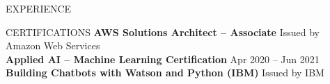\documentclass{resume} %
\begin{document}
\begin{rSection}{EXPERIENCE}
\end{rSection}



\vspace{-0.2em}
\begin{rSection}{CERTIFICATIONS}
\textbf{AWS Solutions Architect – Associate} \hfill Issued by Amazon Web Services \\
\textbf{Applied AI – Machine Learning Certification} \hfill Apr 2020 – Jun 2021 \\
\textbf{Building Chatbots with Watson and Python (IBM)} \hfill Issued by IBM \\

\end{rSection}





\end{document}
